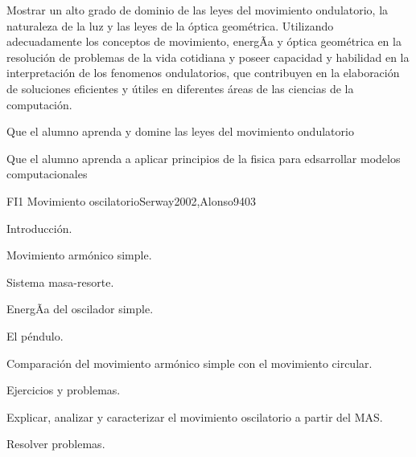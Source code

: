 \begin{syllabus}


\begin{justification}
Mostrar un alto grado de dominio de las leyes del movimiento ondulatorio,
la naturaleza de la luz y las leyes de la óptica geométrica.
Utilizando  adecuadamente los conceptos de movimiento, energÃ­a y óptica
geométrica en la resolución de problemas de la vida cotidiana y poseer
capacidad y habilidad en la interpretación de los fenomenos ondulatorios,
que contribuyen en la elaboración de soluciones eficientes y útiles en
diferentes áreas de las ciencias de la computación.
\end{justification}

\begin{goals}
\item Que el alumno aprenda y domine las leyes del movimiento ondulatorio
\item Que el alumno aprenda a aplicar principios de la fisica para edsarrollar modelos computacionales
\end{goals}

\begin{outcomes}
\end{outcomes}

\begin{unit}{FI1 Movimiento oscilatorio}{Serway2002,Alonso94}{0}{3}
\begin{topics}
      \item Introducción.
      \item Movimiento armónico simple.
      \item Sistema masa-resorte.
      \item EnergÃ­a del oscilador simple.
      \item El péndulo.
      \item Comparación del movimiento armónico simple con el movimiento circular.
      \item Ejercicios y problemas.
   \end{topics}

   \begin{unitgoals}
      \item Explicar, analizar y caracterizar el movimiento oscilatorio a partir del MAS.
      \item Resolver problemas.
   \end{unitgoals}
\end{unit}


\end{syllabus}
